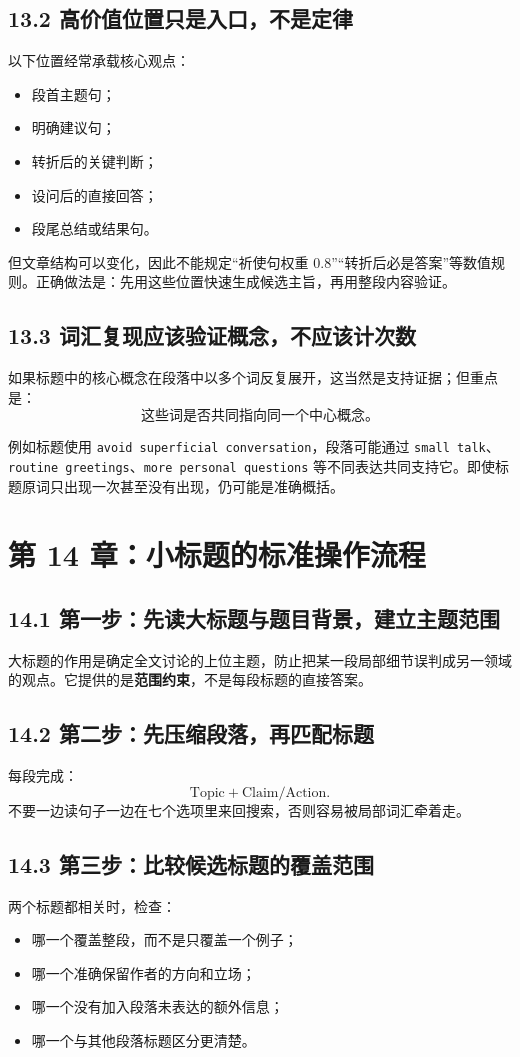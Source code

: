 \documentclass[11pt,a4paper]{ctexart}
\newcommand{\kw}[1]{\textbf{#1}}
\begin{document}
\subsection{13.2 高价值位置只是入口，不是定律}
以下位置经常承载核心观点：
\begin{itemize}
  \item 段首主题句；
  \item 明确建议句；
  \item 转折后的关键判断；
  \item 设问后的直接回答；
  \item 段尾总结或结果句。
\end{itemize}
但文章结构可以变化，因此不能规定“祈使句权重 0.8”“转折后必是答案”等数值规则。正确做法是：先用这些位置快速生成候选主旨，再用整段内容验证。

\subsection{13.3 词汇复现应该验证概念，不应该计次数}
如果标题中的核心概念在段落中以多个词反复展开，这当然是支持证据；但重点是：
\[
\boxed{\text{这些词是否共同指向同一个中心概念。}}
\]

例如标题使用 \texttt{avoid superficial conversation}，段落可能通过 \texttt{small talk}、\texttt{routine greetings}、\texttt{more personal questions} 等不同表达共同支持它。即使标题原词只出现一次甚至没有出现，仍可能是准确概括。

\section{第 14 章：小标题的标准操作流程}

\subsection{14.1 第一步：先读大标题与题目背景，建立主题范围}
大标题的作用是确定全文讨论的上位主题，防止把某一段局部细节误判成另一领域的观点。它提供的是\kw{范围约束}，不是每段标题的直接答案。

\subsection{14.2 第二步：先压缩段落，再匹配标题}
每段完成：
\[
\text{Topic}+\text{Claim/Action}.
\]
不要一边读句子一边在七个选项里来回搜索，否则容易被局部词汇牵着走。

\subsection{14.3 第三步：比较候选标题的覆盖范围}
两个标题都相关时，检查：
\begin{itemize}
  \item 哪一个覆盖整段，而不是只覆盖一个例子；
  \item 哪一个准确保留作者的方向和立场；
  \item 哪一个没有加入段落未表达的额外信息；
  \item 哪一个与其他段落标题区分更清楚。
\end{itemize}
\end{document}
